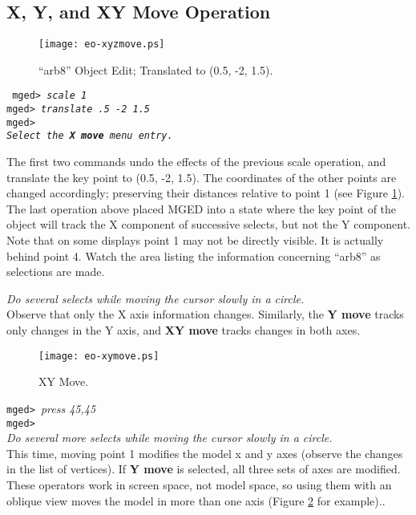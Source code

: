 \subsection{X, Y, and XY Move Operation}

\begin{figure}
\centering \texttt{[image: eo-xyzmove.ps]}
\caption{``arb8'' Object Edit; Translated to (0.5, -2, 1.5).}
\label{eo-xyzmove}
\end{figure}

\noindent
{\tt
mged> {\em scale 1}\\
mged> {\em translate .5 -2 1.5}\\
mged>\\
{\em Select the {\bf X move} menu entry.}\\
}

The first two commands undo the effects of the previous scale operation, and
translate the key point to (0.5, -2, 1.5).  The coordinates of the other
points are changed accordingly; preserving their distances relative
to point 1 (see Figure \ref{eo-xyzmove}).
The last operation above placed MGED into a state where the key point
of the object will track the X component of successive selects, but not the Y
component. Note that on some displays point 1 may not be directly
visible.  It is actually behind point 4. Watch the area listing the
information concerning ``arb8'' as selections are made.

\noindent
{\em Do several selects while moving the cursor slowly in a circle.}\\

   Observe that only the X axis information changes. Similarly, the {\bf
Y move} tracks only changes in the Y axis, and {\bf XY move} tracks
changes in both axes.

\begin{figure}
\centering \texttt{[image: eo-xymove.ps]}
\caption{XY Move.}
\label{eo-xymove}
\end{figure}

\noindent
{\tt mged> }{\em press 45,45}\\
{\tt mged> }\\
{\em Do several more selects while moving the cursor slowly in a circle.}\\

   This time, moving point 1 modifies the model x and y axes (observe the
changes in the list of vertices).  If {\bf Y move} is selected, all
three sets of axes are modified.  These operators work in screen space,
not model space, so using them with an oblique view moves the model in
more than one axis (Figure \ref{eo-xymove} for example)..


